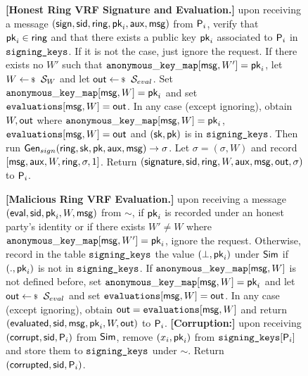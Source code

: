 \begin{figure}
\begin{tcolorbox}[left=2pt,right=2pt]
{			%
			\textbf{[Honest Ring VRF Signature and Evaluation.]} upon receiving a message $(\mathsf{sign}, \textsf{sid}, \mathsf{ring}, \mathsf{pk}_i,\mathsf{aux}, \mathsf{msg})$ from $\mathsf{P}_i$, verify that $\mathsf{pk}_i \in \mathsf{ring}$ and that there exists a public key $\mathsf{pk}_i$ associated to $\mathsf{P}_i$ in $ \texttt{signing\_keys} $. If it is not the case, just ignore the request. 	
			If there exists no $ W' $ such that $ \mathtt{anonymous\_key\_map}[\mathsf{msg},W'] =  \mathsf{pk}_i $, let $ W \leftsample \setsym{S}_W $ and let $\Out \leftsample \setsym{S}_{eval}$. Set $ \mathtt{anonymous\_key\_map}[\mathsf{msg},W] = \mathsf{pk}_i $ and set $ \texttt{evaluations}[\mathsf{msg}, W] = {\mathsf{out}}$.
			In any case (except ignoring), obtain $ W, {\mathsf{out}}$ where $ \mathtt{anonymous\_key\_map}[\mathsf{msg},W] =\mathsf{pk}_i $, $ \texttt{evaluations}[\mathsf{msg}, W] = {\mathsf{out}}$ and  $ (\mathsf{sk}, \mathsf{pk}) $ is in $\texttt{signing\_keys} $. Then run  $ \mathsf{Gen}_{sign}(\mathsf{ring},\mathsf{sk},\mathsf{pk},\mathsf{aux},\mathsf{msg}) \rightarrow \sigma $.
			Let $ \sigma = (\sigma,W)$ and record $ [\mathsf{msg},\mathsf{aux}, W, \mathsf{ring},\sigma, 1] $. Return $(\mathsf{signature}, \textsf{sid}, \mathsf{ring},W,\mathsf{aux},\mathsf{msg}, {\mathsf{out}}, \sigma)$ to $\mathsf{P}_i$.
			
			\textbf{[Malicious Ring VRF Evaluation.]}  upon receiving a message $(\mathsf{eval}, \textsf{sid}, \mathsf{pk}_i, W, \mathsf{msg})$ from $\sim$, if $ \mathsf{pk}_i $ is recorded under an honest party's identity or if there exists $ W'\neq W $ where $ \mathtt{anonymous\_key\_map}[\mathsf{msg},W'] = \mathsf{pk}_i $, ignore the request.
			Otherwise, record in the table $\texttt{signing\_keys}$ the value $(\perp,\mathsf{pk}_i)$ under $\mathsf{Sim}$ if $ (.,\mathsf{pk}_i) $ is not in $ \texttt{signing\_keys} $.
			If  $\mathtt{anonymous\_key\_map}[\mathsf{msg},W]  $ is not defined before, set $ \mathtt{anonymous\_key\_map}[\mathsf{msg},W] = \mathsf{pk}_i $ and let   $\Out \leftsample \setsym{S}_{eval}$ and set $ \texttt{evaluations}[\mathsf{msg}, W] = {\mathsf{out}}$.
			In any case (except ignoring), obtain $ {\mathsf{out}} = \texttt{evaluations}[\mathsf{msg}, W] $ and return $(\mathsf{evaluated}, \textsf{sid},  \mathsf{msg}, \mathsf{pk}_i,W, {\mathsf{out}})$ to $ \mathsf{P}_i $.
			\textbf{[Corruption:] } 
			upon receiving $ (\mathsf{corrupt}, \textsf{sid}, \mathsf{P}_i) $ from $ \mathsf{Sim} $, remove $ (x_i,\mathsf{pk}_i) $ from $ \texttt{signing\_keys}[\mathsf{P}_i] $ and store them to $ \texttt{signing\_keys} $ under $ \sim $. Return $ (\mathsf{corrupted}, \textsf{sid},\mathsf{P}_i) $.
			
}
\end{tcolorbox}
\end{figure}
